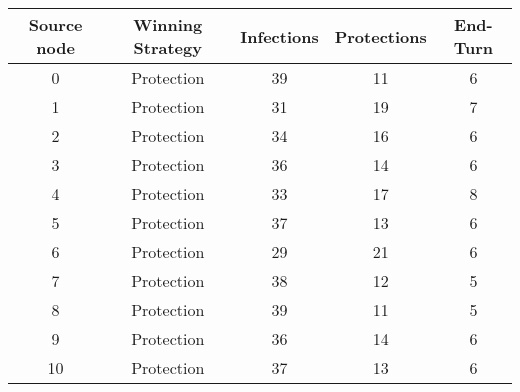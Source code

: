 \documentclass[results.tex]{subfiles}
\begin{document}
    \begin{center}
        \begin{tabular}{| c || c | c | c | c |}
            \hline
            {\bfseries Source node} & {\bfseries Winning Strategy} & {\bfseries Infections} & {\bfseries Protections}
            & {\bfseries End-Turn}
            \\  %
            \hline\hline
            0                       & Protection                   & 39                     & 11                      & 6                    \\
            \hline
            1                       & Protection                   & 31                     & 19                      & 7                    \\
            \hline
            2                       & Protection                   & 34                     & 16                      & 6                    \\
            \hline
            3                       & Protection                   & 36                     & 14                      & 6                    \\
            \hline
            4                       & Protection                   & 33                     & 17                      & 8                    \\
            \hline
            5                       & Protection                   & 37                     & 13                      & 6                    \\
            \hline
            6                       & Protection                   & 29                     & 21                      & 6                    \\
            \hline
            7                       & Protection                   & 38                     & 12                      & 5                    \\
            \hline
            8                       & Protection                   & 39                     & 11                      & 5                    \\
            \hline
            9                       & Protection                   & 36                     & 14                      & 6                    \\
            \hline
            10                      & Protection                   & 37                     & 13                      & 6                    \\

\end{tabular}
\end{center}
\end{document}
